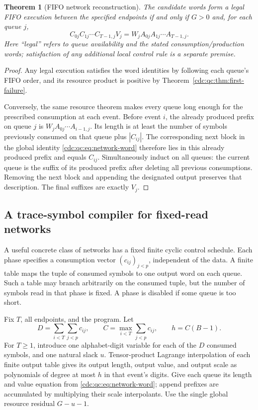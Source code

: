 \documentclass[11pt,a4paper]{article}
\newtheorem{theorem}{Theorem}[section]
\theoremstyle{definition}
\theoremstyle{remark}
\begin{document}
\begin{theorem}[FIFO network reconstruction]\label{cdc:qc:thm:network-causality}
The candidate words form a legal FIFO execution between the specified endpoints if and only if $G>0$ and, for each queue $j$,
\begin{equation}\label{cdc:qc:eq:network-word}
 C_{0j}C_{1j}\cdots C_{T-1,j}V_j
 =W_jA_{0j}A_{1j}\cdots A_{T-1,j}.
\end{equation}
Here ``legal'' refers to queue availability and the stated consumption/production words; satisfaction of any additional local control rule is a separate premise.
\end{theorem}
\begin{proof}
Any legal execution satisfies the word identities by following each queue's FIFO order, and its resource product is positive by Theorem~\ref{cdc:qc:thm:first-failure}.

Conversely, the same resource theorem makes every queue long enough for the prescribed consumption at each event. Before event $i$, the already produced prefix on queue $j$ is $W_jA_{0j}\cdots A_{i-1,j}$. Its length is at least the number of symbols previously consumed on that queue plus $|C_{ij}|$. The corresponding next block in the global identity \eqref{cdc:qc:eq:network-word} therefore lies in this already produced prefix and equals $C_{ij}$. Simultaneously induct on all queues: the current queue is the suffix of its produced prefix after deleting all previous consumptions. Removing the next block and appending the designated output preserves that description. The final suffixes are exactly $V_j$.
\end{proof}

\subsection{A trace-symbol compiler for fixed-read networks}
A useful concrete class of networks has a fixed finite cyclic control schedule. Each phase specifies a consumption vector $(c_{ij})_{j<p}$, independent of the data. A finite table maps the tuple of consumed symbols to one output word on each queue. Such a table may branch arbitrarily on the consumed tuple, but the number of symbols read in that phase is fixed. A phase is disabled if some queue is too short.

Fix $T$, all endpoints, and the program. Let
\[
 D=\sum_{i<T}\sum_{j<p}c_{ij},\qquad
 C=\max_{i<T}\sum_{j<p}c_{ij},\qquad h=C(B-1).
\]
For $T\geq1$, introduce one alphabet-digit variable for each of the $D$ consumed symbols, and one natural slack $u$. Tensor-product Lagrange interpolation of each finite output table gives its output length, output value, and output scale as polynomials of degree at most $h$ in that event's digits. Give each queue its length and value equation from \eqref{cdc:qc:eq:network-word}; append prefixes are accumulated by multiplying their scale interpolants. Use the single global resource residual $G-u-1$.
\end{document}
